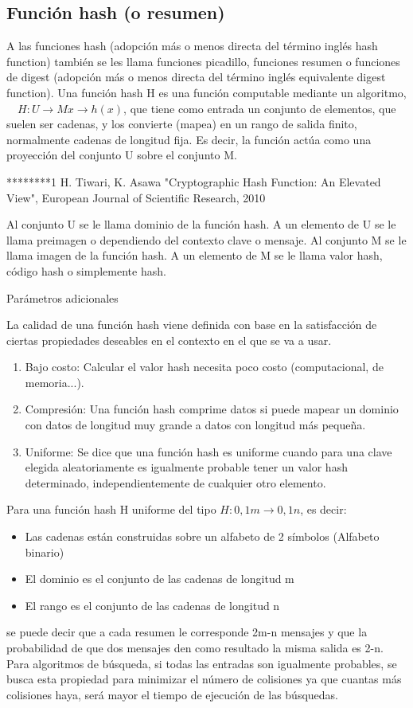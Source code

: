 \documentclass[spanish]{article}
\begin{document}
\subsection{Función hash (o resumen)}
A las funciones hash (adopción más o menos directa del término inglés hash function) también se les llama funciones picadillo, funciones resumen o funciones de digest (adopción más o menos directa del término inglés equivalente digest function). Una función hash H es una función computable mediante un algoritmo,
 $H: U → M
 x → h(x)$,
que tiene como entrada un conjunto de elementos, que suelen ser cadenas, y los convierte (mapea) en un rango de salida finito, normalmente cadenas de longitud fija. Es decir, la función actúa como una proyección del conjunto U sobre el conjunto M.

********1 H. Tiwari, K. Asawa "Cryptographic Hash Function: An Elevated View", European Journal of Scientific Research, 2010


Al conjunto U se le llama dominio de la función hash. A un elemento de U se le llama preimagen o dependiendo del contexto clave o mensaje.
Al conjunto M se le llama imagen de la función hash. A un elemento de M se le llama valor hash, código hash o simplemente hash.

Parámetros adicionales

La calidad de una función hash viene definida con base en la satisfacción de ciertas propiedades deseables en el contexto en el que se va a usar.

\begin{enumerate}
\item Bajo costo: Calcular el valor hash necesita poco costo (computacional, de memoria...). 
\item Compresión: Una función hash comprime datos si puede mapear un dominio con datos de longitud muy grande a datos con longitud más pequeña.
\item Uniforme: Se dice que una función hash es uniforme cuando para una clave elegida aleatoriamente es igualmente probable tener un valor hash determinado, independientemente de cualquier otro elemento.
\end{enumerate}

Para una función hash H uniforme del tipo $H:{0,1}m→{0,1}n$, es decir:
\begin{itemize}
\item Las cadenas están construidas sobre un alfabeto de 2 símbolos (Alfabeto binario)
\item El dominio es el conjunto de las cadenas de longitud m
\item El rango es el conjunto de las cadenas de longitud n\\
\end{itemize}
se puede decir que a cada resumen le corresponde 2m-n mensajes y que la probabilidad de que dos mensajes den como resultado la misma salida es 2-n. Para algoritmos de búsqueda, si todas las entradas son igualmente probables, se busca esta propiedad para minimizar el número de colisiones ya que cuantas más colisiones haya, será mayor el tiempo de ejecución de las búsquedas.
\end{document}
